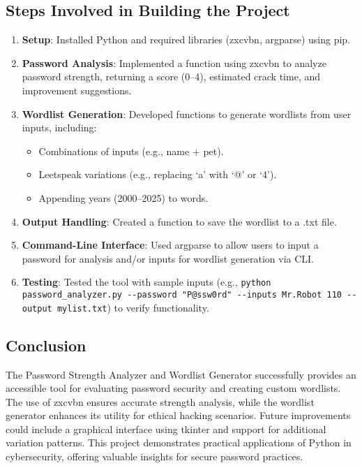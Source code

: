 \documentclass[a4paper,12pt]{article}
\begin{document}
\subsection*{Steps Involved in Building the Project}
\begin{enumerate}
    \item \textbf{Setup}: Installed Python and required libraries (zxcvbn, argparse) using pip.
    \item \textbf{Password Analysis}: Implemented a function using zxcvbn to analyze password strength, returning a score (0--4), estimated crack time, and improvement suggestions.
    \item \textbf{Wordlist Generation}: Developed functions to generate wordlists from user inputs, including:
        \begin{itemize}
            \item Combinations of inputs (e.g., name + pet).
            \item Leetspeak variations (e.g., replacing `a' with `@' or `4').
            \item Appending years (2000--2025) to words.
        \end{itemize}
    \item \textbf{Output Handling}: Created a function to save the wordlist to a .txt file.
    \item \textbf{Command-Line Interface}: Used argparse to allow users to input a password for analysis and/or inputs for wordlist generation via CLI.
    \item \textbf{Testing}: Tested the tool with sample inputs (e.g., \verb|python password_analyzer.py --password "P@ssw0rd" --inputs Mr.Robot 110 --output mylist.txt|) to verify functionality.
\end{enumerate}

\subsection*{Conclusion}
The Password Strength Analyzer and Wordlist Generator successfully provides an accessible tool for evaluating password security and creating custom wordlists. The use of zxcvbn ensures accurate strength analysis, while the wordlist generator enhances its utility for ethical hacking scenarios. Future improvements could include a graphical interface using tkinter and support for additional variation patterns. This project demonstrates practical applications of Python in cybersecurity, offering valuable insights for secure password practices.
\end{document}

